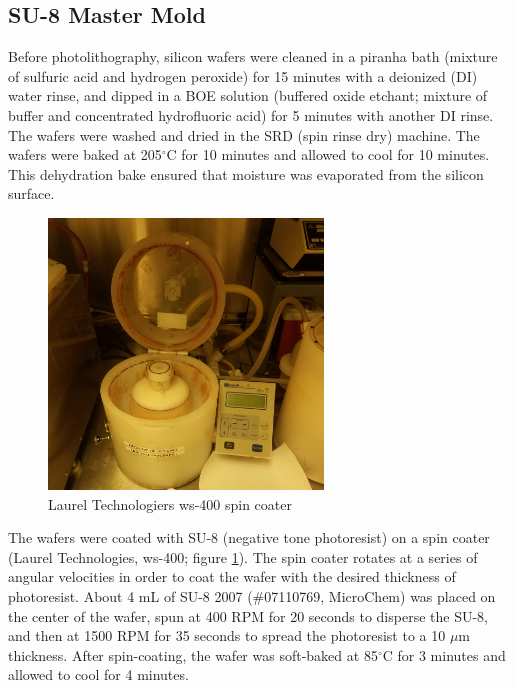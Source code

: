 \subsection*{SU-8 Master Mold}
\par Before photolithography, silicon wafers were cleaned in a piranha bath (mixture of sulfuric acid and hydrogen peroxide) for 15 minutes with a deionized (DI) water rinse, and dipped in a BOE solution (buffered oxide etchant; mixture of buffer and concentrated hydrofluoric acid) for 5 minutes with another DI rinse. The wafers were washed and dried in the SRD (spin rinse dry) machine. The wafers were baked at 205$^\circ$C for 10 minutes and allowed to cool for 10 minutes. This dehydration bake ensured that moisture was evaporated from the silicon surface.
\begin{figure}[h]
    \centering
    \includegraphics[width=0.65\textwidth]{images/resist_spinner_open.jpg}
    \caption{Laurel Technologiers ws-400 spin coater}
    \label{fig:spin_coater}
\end{figure}

\par The wafers were coated with SU-8 (negative tone photoresist) on a spin coater (Laurel Technologies, ws-400; figure \ref{fig:spin_coater}). The spin coater rotates at a series of angular velocities in order to coat the wafer with the desired thickness of photoresist. About 4 mL of SU-8 2007 (\#07110769, MicroChem) was placed on the center of the wafer, spun at 400 RPM for 20 seconds to disperse the SU-8, and then at 1500 RPM for 35 seconds to spread the photoresist to a 10 $\mu$m thickness. After spin-coating, the wafer was soft-baked at 85$^\circ$C for 3 minutes and allowed to cool for 4 minutes.

